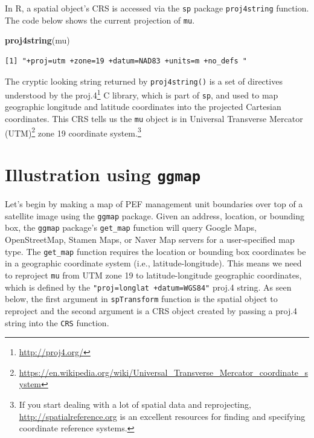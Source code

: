 \documentclass[
]{krantz}
\makeatletter
\newenvironment{Shaded}{\begin{snugshade}}{\end{snugshade}}
\newcommand{\KeywordTok}[1]{\textcolor[rgb]{0.27,0.27,0.27}{\textbf{#1}}}
\newcommand{\NormalTok}[1]{#1}
\renewcommand{\href}[2]{#2\footnote{\url{#1}}}
\newenvironment{kframe}{%
\medskip{}
\setlength{\fboxsep}{.8em}
 \def\at@end@of@kframe{}%
 \ifinner\ifhmode%
  \def\at@end@of@kframe{\end{minipage}}%
  \begin{minipage}{\columnwidth}%
 \fi\fi%
 \def\FrameCommand##1{\hskip\@totalleftmargin \hskip-\fboxsep
 \colorbox{shadecolor}{##1}\hskip-\fboxsep
     \hskip-\linewidth \hskip-\@totalleftmargin \hskip\columnwidth}%
 \MakeFramed {\advance\hsize-\width
   \@totalleftmargin\z@ \linewidth\hsize
   \@setminipage}}%
 {\par\unskip\endMakeFramed%
 \at@end@of@kframe}
\renewenvironment{Shaded}{\begin{kframe}}{\end{kframe}}
\makeatother
\begin{document}
In R, a spatial object's CRS is accessed via the \texttt{sp} package \texttt{proj4string} function. The code below shows the current projection of \texttt{mu}.

\begin{Shaded}
\begin{Highlighting}[]
\KeywordTok{proj4string}\NormalTok{(mu)}
\end{Highlighting}
\end{Shaded}

\begin{verbatim}
[1] "+proj=utm +zone=19 +datum=NAD83 +units=m +no_defs "
\end{verbatim}

The cryptic looking string returned by \texttt{proj4string()} is a set of directives understood by the \href{http://proj4.org/}{proj.4} C library, which is part of \texttt{sp}, and used to map geographic longitude and latitude coordinates into the projected Cartesian coordinates. This CRS tells us the \texttt{mu} object is in \href{https://en.wikipedia.org/wiki/Universal_Transverse_Mercator_coordinate_system}{Universal Transverse Mercator (UTM)} zone 19 coordinate system.\footnote{If you start dealing with a lot of spatial data and reprojecting, \url{http://spatialreference.org} is an excellent resources for finding and specifying coordinate reference systems.}

\hypertarget{ggmap}{%
\section{\texorpdfstring{Illustration using \texttt{ggmap}}{Illustration using ggmap}}\label{ggmap}}

Let's begin by making a map of PEF management unit boundaries over top of a satellite image using the \texttt{ggmap} package. Given an address, location, or bounding box, the \texttt{ggmap} package's \texttt{get\_map} function will query Google Maps, OpenStreetMap, Stamen Maps, or Naver Map servers for a user-specified map type. The \texttt{get\_map} function requires the location or bounding box coordinates be in a geographic coordinate system (i.e., latitude-longitude). This means we need to reproject \texttt{mu} from UTM zone 19 to latitude-longitude geographic coordinates, which is defined by the \texttt{\textquotesingle{}"proj=longlat\ +datum=WGS84"\textquotesingle{}} proj.4 string. As seen below, the first argument in \texttt{spTransform} function is the spatial object to reproject and the second argument is a CRS object created by passing a proj.4 string into the \texttt{CRS} function.
\end{document}
